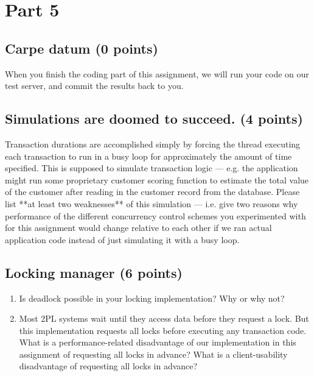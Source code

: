 \documentclass[11pt]{article}
\newcommand{\answer}[1]{}
\newcommand{\answer}[1]{{\color{black}\texttt{{a: - #1}}}}
\begin{document}
\section{Part 5}

\subsection{Carpe datum (0 points)}

When you finish the coding part of this assignment, we will run your code on our test server, and commit the results back to you.

\subsection{Simulations are doomed to succeed. (4 points)}

Transaction durations are accomplished simply by forcing the thread executing each transaction to run in a busy loop for approximately the amount of time specified. This is supposed to simulate transaction logic --- e.g. the application might run some proprietary customer scoring function to estimate the total value of the customer after reading in the customer record from the database. Please list **at least two weaknesses** of this simulation --- i.e. give two reasons why performance of the different concurrency control schemes you experimented with for this assignment would change relative to each other if we ran actual application code instead of just simulating it with a busy loop.

\answer{your answer here...}
\vspace{10mm}

\subsection{Locking manager (6 points)}

\begin{enumerate}
\item Is deadlock possible in your locking implementation? Why or why not? \\
\answer{your answer here...}
\vspace{10mm}

\item Most 2PL systems wait until they access data before they request a lock. But this implementation requests all locks before executing any transaction code. What is a performance-related disadvantage of our implementation in this assignment of requesting all locks in advance? What is a client-usability disadvantage of requesting all locks in advance? \\
\answer{your answer here...}
\vspace{10mm}
\end{enumerate}
\end{document}
